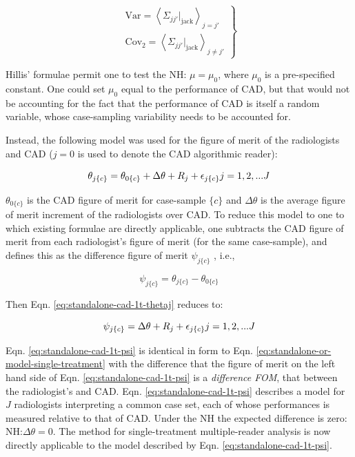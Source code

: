 \documentclass[
]{book}
\begin{document}
\begin{equation}
\left.
\begin{aligned}  
\text{Var} = \left \langle \Sigma_{jj'}|_{\text{jack}} \right \rangle_{j=j'}\\
\text{Cov}_2 = \left \langle \Sigma_{jj'}|_{\text{jack}} \right \rangle_{j \neq j'}
\end{aligned}
\right \}
\label{eq:standalone-cad-1t-rrrc-var-cov2}
\end{equation}

Hillis' formulae \citep{hillis2005comparison, hillis2007comparison} permit one to test the NH: \(\mu = \mu_0\), where \(\mu_0\) is a pre-specified constant. One could set \(\mu_0\) equal to the performance of CAD, but that would not be accounting for the fact that the performance of CAD is itself a random variable, whose case-sampling variability needs to be accounted for.

Instead, the following model was used for the figure of merit of the radiologists and CAD (\(j = 0\) is used to denote the CAD algorithmic reader):

\begin{equation}
\theta_{j\{c\}} = \theta_{0\{c\}} + \Delta \theta + R_j + \epsilon_{j\{c\}}\\
j=1,2,...J
\label{eq:standalone-cad-1t-thetaj}
\end{equation}

\(\theta_{0\{c\}}\) is the CAD figure of merit for case-sample \(\{c\}\) and \(\Delta \theta\) is the average figure of merit increment of the radiologists over CAD. To reduce this model to one to which existing formulae are directly applicable, one subtracts the CAD figure of merit from each radiologist's figure of merit (for the same case-sample), and defines this as the difference figure of merit \(\psi_{j\{c\}}\) , i.e.,

\begin{equation}
\psi_{j\{c\}} = \theta_{j\{c\}} - \theta_{0\{c\}}
\label{eq:standalone-cad-diff-reader-def}
\end{equation}

Then Eqn. \eqref{eq:standalone-cad-1t-thetaj} reduces to:

\begin{equation}
\psi_{j\{c\}} = \Delta \theta + R_j + \epsilon_{j\{c\}}\\
j=1,2,...J
\label{eq:standalone-cad-1t-psi}
\end{equation}

Eqn. \eqref{eq:standalone-cad-1t-psi} is identical in form to Eqn. \eqref{eq:standalone-or-model-single-treatment} with the difference that the figure of merit on the left hand side of Eqn. \eqref{eq:standalone-cad-1t-psi} is a \emph{difference FOM}, that between the radiologist's and CAD. Eqn. \eqref{eq:standalone-cad-1t-psi} describes a model for \(J\) radiologists interpreting a common case set, each of whose performances is measured relative to that of CAD. Under the NH the expected difference is zero: \(\text{NH:} \Delta \theta = 0\). The method \citep{hillis2005comparison, hillis2007comparison} for single-treatment multiple-reader analysis is now directly applicable to the model described by Eqn. \eqref{eq:standalone-cad-1t-psi}.
\end{document}
